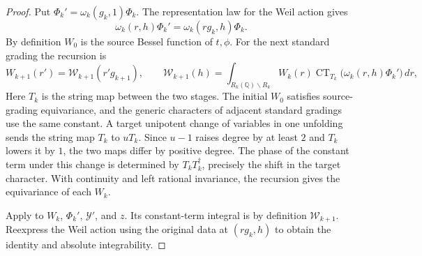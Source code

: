 \begin{proof}
Put $\Phi_k'=\omega_k(g_k,1)\Phi_k$. The representation law for the Weil action gives
\[
 \omega_k(r,h)\Phi_k'=\omega_k(rg_k,h)\Phi_k .
\]
By definition $W_0$ is the source Bessel function of $t,\phi$. For the next standard grading the recursion is
\[
 W_{k+1}(r')=\mathcal W_{k+1}(r'g_{k+1}),
 \qquad
 \mathcal W_{k+1}(h)=
 \int_{R_k(\mathbb Q)\backslash R_k}
    W_k(r)\operatorname{CT}_{T_k}\bigl(\omega_k(r,h)\Phi_k'\bigr)\,dr ,
\]
Here $T_k$ is the string map between the two stages. The initial $W_0$ satisfies source-grading equivariance, and the generic characters of adjacent standard gradings use the same constant. A target unipotent change of variables in one unfolding sends the string map $T_k$ to $uT_k$. Since $u-1$ raises degree by at least $2$ and $T_k$ lowers it by $1$, the two maps differ by positive degree. The phase of the constant term under this change is determined by $T_kT_k^\dagger$, precisely the shift in the target character. With continuity and left rational invariance, the recursion gives the equivariance of each $W_k$.

Apply  to $W_k$, $\Phi_k'$, $\mathcal Y'$, and $z$. Its constant-term integral is by definition $\mathcal W_{k+1}$. Reexpress the Weil action using the original data at $(rg_k,h)$ to obtain the identity and absolute integrability.
\end{proof}


